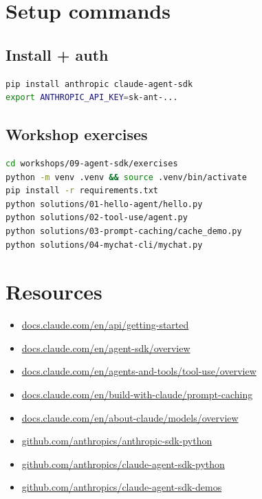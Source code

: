 \documentclass[11pt,a4paper]{article}
\begin{document}
\section{Setup commands}

\subsection{Install + auth}

\begin{lstlisting}[language=bash]
pip install anthropic claude-agent-sdk
export ANTHROPIC_API_KEY=sk-ant-...
\end{lstlisting}

\subsection{Workshop exercises}

\begin{lstlisting}[language=bash]
cd workshops/09-agent-sdk/exercises
python -m venv .venv && source .venv/bin/activate
pip install -r requirements.txt
python solutions/01-hello-agent/hello.py
python solutions/02-tool-use/agent.py
python solutions/03-prompt-caching/cache_demo.py
python solutions/04-mychat-cli/mychat.py
\end{lstlisting}

\section{Resources}

\begin{itemize}
\item \href{https://docs.claude.com/en/api/getting-started}{docs.claude.com/en/api/getting-started}
\item \href{https://docs.claude.com/en/agent-sdk/overview}{docs.claude.com/en/agent-sdk/overview}
\item \href{https://docs.claude.com/en/agents-and-tools/tool-use/overview}{docs.claude.com/en/agents-and-tools/tool-use/overview}
\item \href{https://docs.claude.com/en/build-with-claude/prompt-caching}{docs.claude.com/en/build-with-claude/prompt-caching}
\item \href{https://docs.claude.com/en/about-claude/models/overview}{docs.claude.com/en/about-claude/models/overview}
\item \href{https://github.com/anthropics/anthropic-sdk-python}{github.com/anthropics/anthropic-sdk-python}
\item \href{https://github.com/anthropics/claude-agent-sdk-python}{github.com/anthropics/claude-agent-sdk-python}
\item \href{https://github.com/anthropics/claude-agent-sdk-demos}{github.com/anthropics/claude-agent-sdk-demos}
\end{itemize}
\end{document}
